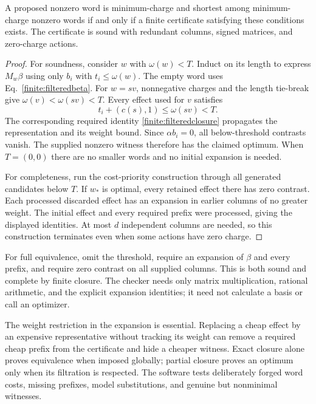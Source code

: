 \begin{theorem}
\label{finite:filtered}
A proposed nonzero word is minimum-charge and shortest among
minimum-charge nonzero words if and only if a finite certificate satisfying
these conditions exists. The certificate is sound with redundant columns,
signed matrices, and zero-charge actions.
\end{theorem}
\begin{proof}
For soundness, consider $w$ with $\omega(w)<T$. Induct on its length to
express $M_w\beta$ using only $b_i$ with $t_i\leq\omega(w)$. The empty
word uses Eq.~\eqref{finite:filteredbeta}. For $w=sv$, nonnegative
charges and the length tie-break give
$\omega(v)<\omega(sv)<T$. Every effect used for $v$ satisfies
\begin{equation}
 t_i+(c(s),1)\leq\omega(sv)<T.
\end{equation}
The corresponding required identity
\eqref{finite:filteredclosure} propagates the representation and its
weight bound. Since $\alpha b_i=0$, all below-threshold contrasts vanish.
The supplied nonzero witness therefore has the claimed optimum. When
$T=(0,0)$ there are no smaller words and no initial expansion is needed.

For completeness, run the cost-priority construction through all generated
candidates below $T$. If $w_*$ is optimal, every retained effect there
has zero contrast. Each processed discarded effect has an expansion in
earlier columns of no greater weight. The initial effect and every required
prefix were processed, giving the displayed identities. At most $d$
independent columns are needed, so this construction terminates even when
some actions have zero charge.
\end{proof}

For full equivalence, omit the threshold, require an expansion of $\beta$
and every prefix, and require zero contrast on all supplied columns.
This is both sound and complete by finite closure. The checker needs only
matrix multiplication, rational arithmetic, and the explicit expansion
identities; it need not calculate a basis or call an optimizer.

The weight restriction in the expansion is essential. Replacing a cheap
effect by an expensive representative without tracking its weight can
remove a required cheap prefix from the certificate and hide a cheaper
witness. Exact closure alone proves equivalence when imposed globally;
partial closure proves an optimum only when its filtration is respected.
The software tests deliberately forged word costs, missing prefixes,
model substitutions, and genuine but nonminimal witnesses.

